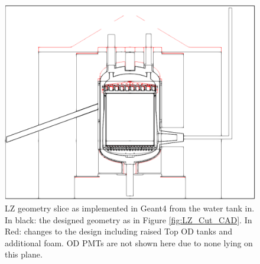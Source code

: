 \begin{figure}[!htbp]
\includegraphics[width=\textwidth]{Figures/Geometry/geometry_differences_black_and_white.png}
\centering
\caption{LZ geometry slice as implemented in Geant4 from the water tank in. In black: the designed geometry as in Figure \ref{fig:LZ_Cut_CAD}. In Red: changes to the design including raised Top OD tanks and additional foam. OD PMTs are not shown here due to none lying on this plane.}
\label{fig:Geometry_Differences}
\end{figure}


